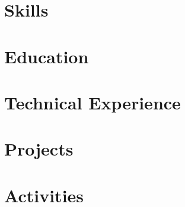 \documentclass[letter,10pt]{article}
\begin{document}
\section{Skills}


\section{Education}


\section{Technical Experience}


\section{Projects}





\section{Activities}

\end{document}
